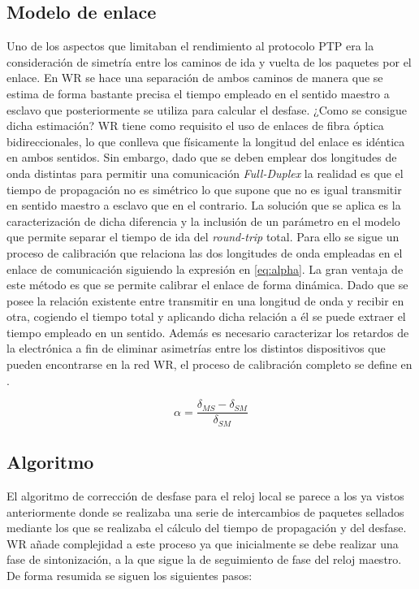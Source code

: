\subsection{Modelo de enlace}

Uno de los aspectos que limitaban el rendimiento al protocolo PTP era la 
consideración de simetría entre los caminos de ida y vuelta de los paquetes por 
el enlace. En WR se hace una separación de ambos caminos de manera que se 
estima de forma bastante precisa el tiempo empleado en el sentido maestro a 
esclavo que posteriormente se utiliza para calcular el desfase. ¿Como se 
consigue dicha estimación? WR tiene como requisito el uso de enlaces de fibra 
óptica bidireccionales, lo que conlleva que físicamente la longitud del enlace 
es idéntica en ambos sentidos. Sin embargo, dado que se deben emplear dos 
longitudes de onda distintas para permitir una comunicación 
\textit{Full-Duplex} la realidad es que el tiempo de propagación no es 
simétrico lo que supone que no es igual transmitir en sentido maestro a esclavo 
que en el contrario. La solución que se aplica es la caracterización de dicha 
diferencia y la inclusión de un parámetro en el modelo que permite separar el 
tiempo de ida del \textit{round-trip} total. Para ello se sigue un proceso de 
calibración que relaciona las dos longitudes de onda empleadas en el enlace de 
comunicación siguiendo la expresión en \ref{eq:alpha}. La gran ventaja de este 
método es que se permite calibrar el 
enlace de forma dinámica. Dado que se posee la relación existente entre 
transmitir en una longitud de onda y recibir en otra, cogiendo el tiempo total 
y aplicando dicha relación a él se puede extraer el tiempo empleado en un 
sentido. Además es necesario caracterizar los retardos de la electrónica a fin 
de eliminar asimetrías entre los distintos dispositivos que pueden encontrarse 
en la red WR, el proceso de calibración completo se define en \cite{man:calib}.

\begin{equation}\label{eq:alpha}
\alpha = \frac {\delta_{MS} - \delta_{SM}} {\delta_{SM}}
\end{equation}

\subsection{Algoritmo}

El algoritmo de corrección de desfase para el reloj local se parece a los ya 
vistos anteriormente donde se realizaba una serie de intercambios de paquetes 
sellados mediante los que se realizaba el cálculo del tiempo de propagación y 
del desfase. WR añade complejidad a este proceso ya que inicialmente se debe 
realizar una fase de sintonización, a la que sigue la de seguimiento de fase 
del reloj maestro. De forma resumida se siguen los siguientes pasos:

